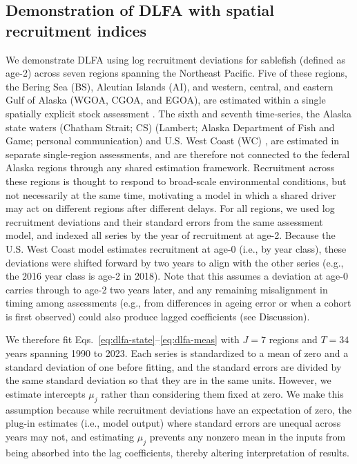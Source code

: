 \documentclass[12pt]{article}
\begin{document}
\subsection{Demonstration of DLFA with spatial recruitment indices}
\label{sec:application}
We demonstrate DLFA using log recruitment deviations for sablefish
(defined as age-2) across seven regions spanning the Northeast Pacific. Five of
these regions, the Bering Sea (BS), Aleutian Islands (AI), and western,
central, and eastern Gulf of Alaska (WGOA, CGOA, and EGOA), are
estimated within a single spatially explicit stock assessment
\citep{Cheng2025Panmictic}. The sixth and seventh time-series, the
Alaska state waters (Chatham Strait; CS) (Lambert; Alaska Department of
Fish and Game; personal communication) and U.S. West Coast (WC)
\citep{Wetzel2025Sablefish}, are estimated in separate single-region
assessments, and are therefore not connected to the federal Alaska
regions through any shared estimation framework. Recruitment across
these regions is thought to respond to broad-scale environmental
conditions, but not necessarily at the same time, motivating a model in
which a shared driver may act on different regions after different
delays. For all regions, we used log recruitment deviations and their
standard errors from the same assessment model, and indexed all series
by the year of recruitment at age-2. Because the U.S. West Coast
model estimates recruitment at age-0 (i.e., by year class), these
deviations were shifted forward by two years to align with the other
series (e.g., the 2016 year class is age-2 in 2018). Note that this
assumes a deviation at age-0 carries through to age-2 two years later,
and any remaining misalignment in timing among assessments (e.g., from
differences in ageing error or when a cohort is first observed) could
also produce lagged coefficients (see Discussion).

We therefore fit Eqs.~\ref{eq:dlfa-state}--\ref{eq:dlfa-meas} with $J =
7$ regions and $T = 34$ years spanning 1990 to 2023. Each series is
standardized to a mean of zero and a standard deviation of one before
fitting, and the standard errors are divided by the same standard
deviation so that they are in the same units. However, we estimate intercepts $\mu_j$ rather than considering
them fixed at zero. We make this assumption because while recruitment
deviations have an expectation of zero, the plug-in estimates (i.e.,
model output) where standard errors are unequal across years may not,
and estimating $\mu_j$ prevents any nonzero mean in the inputs from
being absorbed into the lag coefficients, thereby altering
interpretation of results.
\end{document}
